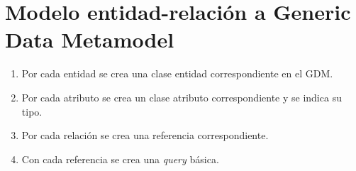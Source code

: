 \section{Modelo entidad-relación a Generic Data Metamodel}

\begin{enumerate}
    \item Por cada entidad se crea una clase entidad correspondiente en el GDM. 
    \item Por cada atributo se crea un clase atributo correspondiente y se indica su tipo.
    \item Por cada relación se crea una referencia correspondiente.
    \item Con cada referencia se crea una \textit{query} básica.
\end{enumerate}